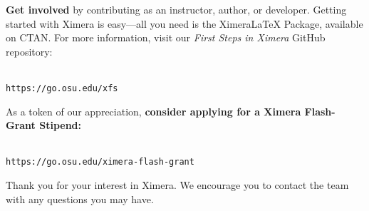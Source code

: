 \documentclass[twocolumn]{article}
\begin{document}
\begin{xframe}
    {\sffamily\bfseries Get involved} by contributing as an instructor, author,
    or developer. Getting started with Ximera is easy---all you need is the
    XimeraLaTeX Package, available on CTAN. For more information, visit our
    \textit{First Steps in Ximera} GitHub repository:
    \begin{center}
        \\
        \small\tt https://go.osu.edu/xfs
    \end{center}
    As a token of our appreciation, \textbf{consider applying for a Ximera
        Flash-Grant Stipend:}
    \begin{center}
        \\
        \small\tt https://go.osu.edu/ximera-flash-grant
    \end{center}
    Thank you for your interest in Ximera. We encourage you to contact the
    team with any questions you may have.
\end{xframe}
\end{document}
